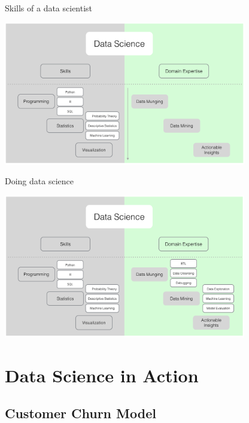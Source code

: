 \documentclass[10pt]{beamer}
\begin{document}
    \begin{frame}{Skills of a data scientist}
      \begin{center}
        \includegraphics[width=300pt]{../graphs/data_science_skills}
      \end{center}
    \end{frame}

    \begin{frame}{Doing data science}
      \begin{center}
        \includegraphics[width=300pt]{../graphs/data_science_skills_domain}
      \end{center}
    \end{frame}

\section{Data Science in Action}

  \subsection{Customer Churn Model}
\end{document}

